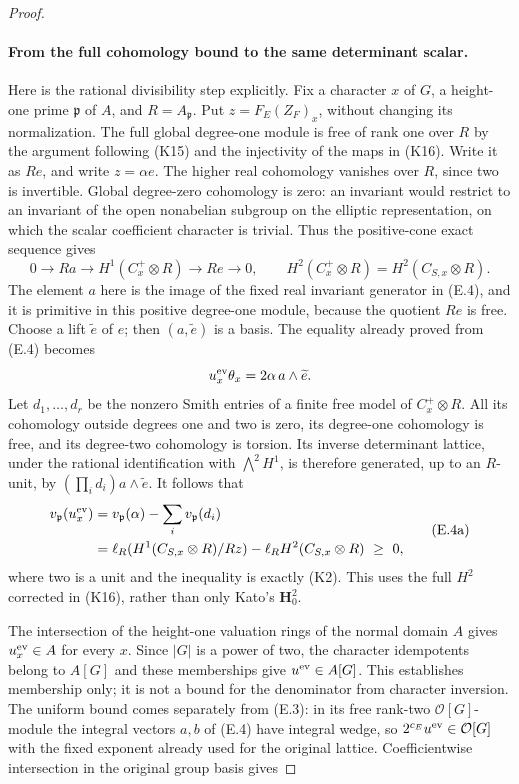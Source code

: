 \documentclass[11pt]{article}
\theoremstyle{definition}
\theoremstyle{remark}
\providecommand{\mathscr}[1]{\mathcal{#1}}
\begin{document}
\begin{proof}
\paragraph{From the full cohomology bound to the same determinant scalar.}
Here is the rational divisibility step explicitly. Fix a character
$x$ of $G$, a height-one prime $\mathfrak p$ of $A$, and
$R=A_{\mathfrak p}$. Put $z=F_E(Z_F)_x$, without changing its
normalization. The full global degree-one module is free of rank one
over $R$ by the argument following (K15) and the injectivity of the
maps in (K16). Write it as $Re$, and write $z=\alpha e$.
The higher real cohomology vanishes over $R$, since two is invertible.
Global degree-zero cohomology is zero: an invariant would restrict
to an invariant of the open nonabelian subgroup on the elliptic
representation, on which the scalar coefficient character is trivial.
Thus the positive-cone exact sequence gives
\[
 0\longrightarrow R a\longrightarrow
 H^1(C^+_x\otimes R)\longrightarrow Re\longrightarrow0,
 \qquad
 H^2(C^+_x\otimes R)=H^2(C_{S,x}\otimes R).
\]
The element $a$ here is the image of the fixed real invariant generator
in (E.4), and it is primitive in this positive degree-one module,
because the quotient $Re$ is free. Choose a lift $\widetilde e$ of $e$;
then $(a,\widetilde e)$ is a basis. The equality already proved from
(E.4) becomes
\[
                 u_x^{\rm ev}\theta_x
                  =2\alpha\,a\wedge\widetilde e.
\]
Let $d_1,\ldots,d_r$ be the nonzero Smith entries of a finite free
model of $C^+_x\otimes R$. All its cohomology outside degrees one and
two is zero, its degree-one cohomology is free, and its degree-two
cohomology is torsion. Its inverse determinant lattice, under the
rational identification with $\bigwedge^2H^1$, is therefore generated,
up to an $R$-unit, by
$(\prod_i d_i)a\wedge\widetilde e$. It follows that
\[
 \begin{split}
 v_{\mathfrak p}(u_x^{\rm ev})
 &=v_{\mathfrak p}(\alpha)-\sum_i v_{\mathfrak p}(d_i)\\
 &=\ell_R(H^1(C_{S,x}\otimes R)/Rz)
       -\ell_R H^2(C_{S,x}\otimes R)\ \geq\ 0,
 \end{split}                                                   \tag{E.4a}
\]
where two is a unit and the inequality is exactly (K2).
This uses the full $H^2$ corrected in (K16), rather than only Kato's
$\mathbf H^2_0$.

The intersection of the height-one valuation rings of the normal
domain $A$ gives $u_x^{\rm ev}\in A$ for every $x$. Since $|G|$ is
a power of two, the character idempotents belong to $A[G]$ and these
memberships give $u^{\rm ev}\in A[G]$. This establishes membership
only; it is not a bound for the denominator from character inversion.
The uniform bound comes separately from (E.3): in its free rank-two
$\mathscr O[G]$-module the integral vectors $a,b$ of (E.4) have integral
wedge, so $2^{c_E}u^{\rm ev}\in\mathscr O[G]$ with the fixed exponent
already used for the original lattice. Coefficientwise intersection
in the original group basis gives



\end{proof}
\end{document}
